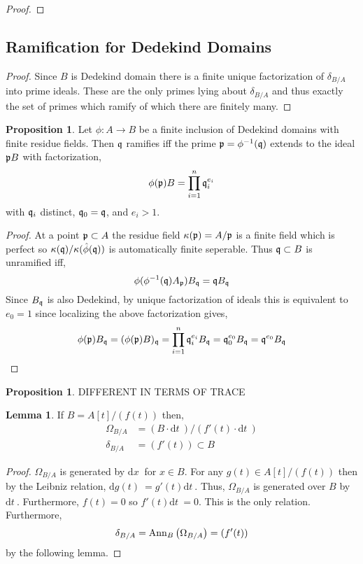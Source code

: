 \documentclass[12pt]{extarticle}
\renewcommand{\d}[1]{ \mathrm{d}#1 \:}
\theoremstyle{definition}
\newtheorem{lemma}[theorem]{Lemma}
\newtheorem{proposition}[theorem]{Proposition}
\begin{document}
\begin{proof}

\end{proof}

\subsection{Ramification for Dedekind Domains}

\begin{proof}
Since $B$ is Dedekind domain there is a finite unique factorization of $\delta_{B / A}$ into prime ideals. These are the only primes lying about $\delta_{B/A}$ and thus exactly the set of primes which ramify of which there are finitely many.  
\end{proof}

\begin{proposition}
Let $\phi : A \to B$ be a finite inclusion of Dedekind domains with finite residue fields. Then $\mathfrak{q}$ ramifies iff the prime $\mathfrak{p} = \phi^{-1}(\mathfrak{q})$ extends to the ideal $\mathfrak{p} B$ with factorization,
\[ \phi(\mathfrak{p}) B  = \prod_{i = 1}^{n} \mathfrak{q}_i^{e_i} \]
with $\mathfrak{q}_i$ distinct, $\mathfrak{q}_0 = \mathfrak{q}$, and $e_i > 1$. 
\end{proposition}

\begin{proof}
At a point $\mathfrak{p} \subset A$ the residue field $\kappa(\mathfrak{p}) = A / \mathfrak{p}$ is a finite field which is perfect so $\kappa(\mathfrak{q}) / \kappa(\hat{\phi}(\mathfrak{q}))$ is automatically finite seperable. Thus $\mathfrak{q} \subset B$ is unramified iff,
\[ \phi(\phi^{-1}(\mathfrak{q}) A_{\mathfrak{p}}) B_{\mathfrak{q}} = \mathfrak{q} B_{\mathfrak{q}} \]
Since $B_{\mathfrak{q}}$ is also Dedekind, by unique factorization of ideals this is equivalent to $e_0 = 1$ since localizing the above factorization gives,
\[ \phi(\mathfrak{p}) B_{\mathfrak{q}} = (\phi(\mathfrak{p}) B)_{\mathfrak{q}} = \prod_{i = 1}^{n} \mathfrak{q}_i^{e_i} B_{\mathfrak{q}} = \mathfrak{q}_0^{e_0} B_{\mathfrak{q}} = \mathfrak{q}^{e_0} B_{\mathfrak{q}} \]
\end{proof}

\begin{proposition}
DIFFERENT IN TERMS OF TRACE
\end{proposition}

\begin{lemma}
If $B = A[t]/(f(t))$ then,
\begin{align*}
\Omega_{B / A} & = (B \cdot \d{t}) /(f'(t) \cdot \d{t})
\\
\delta_{B / A} & = (f'(t)) \subset B
\end{align*}
\end{lemma}

\begin{proof}
$\Omega_{B / A}$ is generated by $\d{x}$ for $x \in B$. For any $g(t) \in A[t]/(f(t))$ then by the Leibniz relation, $\d{g(t)} = g'(t) \d{t}$. Thus, $\Omega_{B / A}$ is generated over $B$ by $\d{t}$. Furthermore, $f(t) = 0$ so $f'(t) \d{t} = 0$. This is the only relation. Furthermore,
\[ \delta_{B / A} = \mathrm{Ann}_{B}\left( \Omega_{B/A} \right) = (f'(t)) \]
by the following lemma.
\end{proof}
\end{document}
